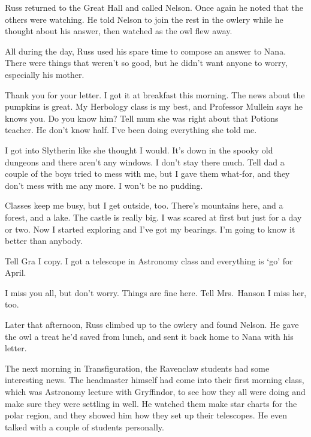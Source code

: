 Russ returned to the Great Hall and called Nelson. Once again he noted that the others were watching. He told Nelson to join the rest in the owlery while he thought about his answer, then watched as the owl flew away.

All during the day, Russ used his spare time to compose an answer to Nana. There were things that weren't so good, but he didn't want anyone to worry, especially his mother.

\begin{writtenNote}


Thank you for your letter. I got it at breakfast this morning. The news about the pumpkins is great. My Herbology class is my best, and Professor Mullein says he knows you. Do you know him? Tell mum she was right about that Potions teacher. He don't know half. I've been doing everything she told me.

I got into Slytherin like she thought I would. It's down in the spooky old dungeons and there aren't any windows. I don't stay there much. Tell dad a couple of the boys tried to mess with me, but I gave them what-for, and they don't mess with me any more. I won't be no pudding.

Classes keep me busy, but I get outside, too. There's mountains here, and a forest, and a lake. The castle is really big. I was scared at first but just for a day or two. Now I started exploring and I've got my bearings. I'm going to know it better than anybody.

Tell Gra I copy. I got a telescope in Astronomy class and everything is `go' for April.

I miss you all, but don't worry. Things are fine here. Tell Mrs.~Hanson I miss her, too.


\end{writtenNote}

Later that afternoon, Russ climbed up to the owlery and found Nelson. He gave the owl a treat he'd saved from lunch, and sent it back home to Nana with his letter.

The next morning in Transfiguration, the Ravenclaw students had some interesting news. The headmaster himself had come into their first morning class, which was Astronomy lecture with Gryffindor, to see how they all were doing and make sure they were settling in well. He watched them make star charts for the polar region, and they showed him how they set up their telescopes. He even talked with a couple of students personally.

